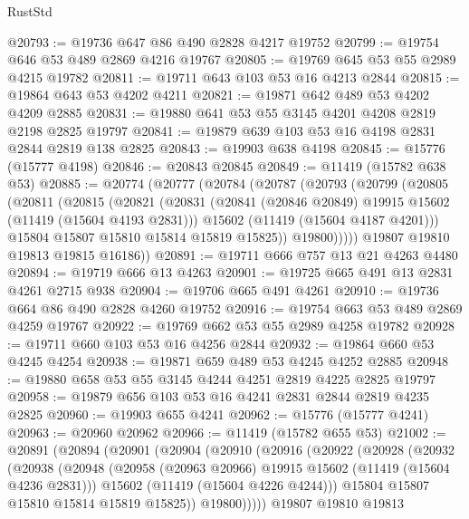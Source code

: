 \begin{lexlean}{RustStd}
\begin{coremodule}
@20793 := @19736 @647 @86 @490 @2828 @4217 @19752
@20799 := @19754 @646 @53 @489 @2869 @4216 @19767
@20805 := @19769 @645 @53 @55 @2989 @4215 @19782
@20811 := @19711 @643 @103 @53 @16 @4213 @2844
@20815 := @19864 @643 @53 @4202 @4211
@20821 := @19871 @642 @489 @53 @4202 @4209 @2885
@20831 := @19880 @641 @53 @55 @3145 @4201 @4208 @2819 @2198 @2825 @19797
@20841 := @19879 @639 @103 @53 @16 @4198 @2831 @2844 @2819 @138 @2825
@20843 := @19903 @638 @4198
@20845 := @15776 (@15777 @4198)
@20846 := @20843 @20845
@20849 := @11419 (@15782 @638 @53)
@20885 := @20774
    (@20777
      (@20784
        (@20787
          (@20793
            (@20799
              (@20805
                (@20811
                  (@20815
                    (@20821
                      (@20831
                        (@20841 (@20846 @20849) @19915 @15602 (@11419 (@15604 @4193 @2831)))
                        @15602
                        (@11419 (@15604 @4187 @4201)))
                      @15804
                      @15807
                      @15810
                      @15814
                      @15819
                      @15825))
                  @19800)))))
        @19807
        @19810
        @19813
        @19815
        @16186))
@20891 := @19711 @666 @757 @13 @21 @4263 @4480
@20894 := @19719 @666 @13 @4263
@20901 := @19725 @665 @491 @13 @2831 @4261 @2715 @938
@20904 := @19706 @665 @491 @4261
@20910 := @19736 @664 @86 @490 @2828 @4260 @19752
@20916 := @19754 @663 @53 @489 @2869 @4259 @19767
@20922 := @19769 @662 @53 @55 @2989 @4258 @19782
@20928 := @19711 @660 @103 @53 @16 @4256 @2844
@20932 := @19864 @660 @53 @4245 @4254
@20938 := @19871 @659 @489 @53 @4245 @4252 @2885
@20948 := @19880 @658 @53 @55 @3145 @4244 @4251 @2819 @4225 @2825 @19797
@20958 := @19879 @656 @103 @53 @16 @4241 @2831 @2844 @2819 @4235 @2825
@20960 := @19903 @655 @4241
@20962 := @15776 (@15777 @4241)
@20963 := @20960 @20962
@20966 := @11419 (@15782 @655 @53)
@21002 := @20891
    (@20894
      (@20901
        (@20904
          (@20910
            (@20916
              (@20922
                (@20928
                  (@20932
                    (@20938
                      (@20948
                        (@20958 (@20963 @20966) @19915 @15602 (@11419 (@15604 @4236 @2831)))
                        @15602
                        (@11419 (@15604 @4226 @4244)))
                      @15804
                      @15807
                      @15810
                      @15814
                      @15819
                      @15825))
                  @19800)))))
        @19807
        @19810
        @19813

\end{coremodule}
\end{lexlean}
